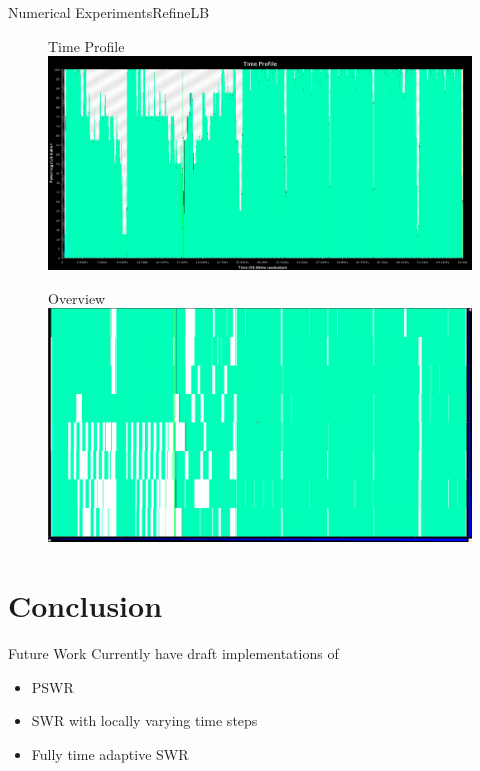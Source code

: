 \documentclass[]{beamer}
\begin{document}
\begin{frame}{Numerical Experiments}{RefineLB}
  \begin{figure}{Time Profile}
    \includegraphics[width=.65\paperwidth,height=.35\paperheight]{figures/LoadBalancing/TimeProfileRefineLB}
  \end{figure}
  \begin{figure}{\hspace{15pt}Overview}
    \includegraphics[width=.65\paperwidth,height=.35\paperheight]{figures/LoadBalancing/OverviewRefineLB}
  \end{figure}
\end{frame}


\section{Conclusion}

\begin{frame}{Future Work}
  Currently have draft implementations of
  \begin{itemize}
  \item PSWR
  \item SWR with locally varying time steps
  \item Fully time adaptive SWR
  \end{itemize}
\end{frame}
\end{document}
